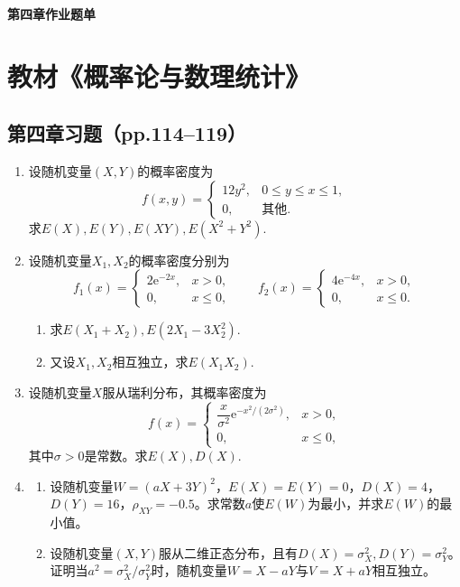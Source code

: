 \documentclass[UTF8]{ctexart}
\begin{document}
\begin{center}
\LARGE\bfseries 第四章作业题单
\end{center}

\section*{教材《概率论与数理统计》}

\subsection*{第四章习题（pp.114--119）}

\begin{enumerate}
\renewcommand{\labelenumi}{\textbf{\arabic{enumi}.}}
\setcounter{enumi}{8}
\item 设随机变量$(X,Y)$的概率密度为
\[
f(x,y)=
\begin{cases}
12y^{2}, & 0\le y\le x\le 1,\\[4pt]
0, & \text{其他}.
\end{cases}
\]
求$E(X),E(Y),E(XY),E(X^{2}+Y^{2})$.

\setcounter{enumi}{13}
\item 设随机变量$X_{1},X_{2}$的概率密度分别为
\[
f_{1}(x)=
\begin{cases}
2\mathrm{e}^{-2x}, & x>0,\\[4pt]
0, & x\le 0,
\end{cases}
\qquad
f_{2}(x)=
\begin{cases}
4\mathrm{e}^{-4x}, & x>0,\\[4pt]
0, & x\le 0.
\end{cases}
\]
\begin{enumerate}
\item[(1)] 求$E(X_{1}+X_{2}),E(2X_{1}-3X_{2}^{2})$.
\item[(2)] 又设$X_{1},X_{2}$相互独立，求$E(X_{1}X_{2})$.
\end{enumerate}

\setcounter{enumi}{17}
\item 设随机变量$X$服从瑞利分布，其概率密度为
\[
f(x)=
\begin{cases}
\dfrac{x}{\sigma^{2}}\mathrm{e}^{-x^{2}/(2\sigma^{2})}, & x>0,\\[8pt]
0, & x\le 0,
\end{cases}
\]
其中$\sigma>0$是常数。求$E(X),D(X)$.

\setcounter{enumi}{33}
\item 
\begin{enumerate}
\item[(1)] 设随机变量$W=(aX+3Y)^{2}$，$E(X)=E(Y)=0$，$D(X)=4$，$D(Y)=16$，$\rho_{XY}=-0.5$。求常数$a$使$E(W)$为最小，并求$E(W)$的最小值。
\item[(2)] 设随机变量$(X,Y)$服从二维正态分布，且有$D(X)=\sigma_{X}^{2},D(Y)=\sigma_{Y}^{2}$。证明当$a^{2}=\sigma_{X}^{2}/\sigma_{Y}^{2}$时，随机变量$W=X-aY$与$V=X+aY$相互独立。
\end{enumerate}


\end{enumerate}
\end{document}
